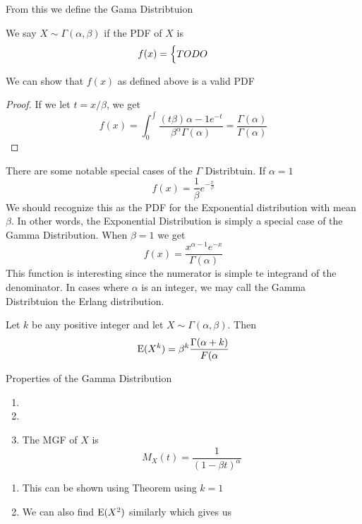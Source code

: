 \documentclass{report}
\begin{document}
From this we define the Gama Distribtuion
\begin{definition}
    We say $X\sim\Gamma(\alpha,\beta)$ if the PDF of $X$ is
    \[
        f(x)=\begin{cases}
            TODO\quad
        \end{cases}
    \]
\end{definition}
We can show that $f(x)$ as defined above is a valid PDF
\begin{proof}
    If we let $t=x/\beta$, we get
    \[
        f(x)=\int_0^\int \frac{(t\beta)^{}\alpha-1 e^{-t}}{\beta^{\alpha} \Gamma(\alpha)}=\frac{\Gamma(\alpha)}{\Gamma(\alpha)}
    \]
\end{proof}

There are some notable special cases of the $\Gamma $ Distribtuin. If $\alpha = 1 $
\[
    f(x)=\frac 1\beta e^{-\frac x \beta}
\]
We should recognize this as the PDF for the Exponential distribution with mean $\beta$. In other words, the Exponential Distribution is simply a special case of the Gamma Distribution. When $\beta=1$ we get
\[
    f(x)=\frac{x^{\alpha-1}e^{-x}}{\Gamma(\alpha)}
\]
This function is interesting since the numerator is simple te integrand of the denominator. In cases where $\alpha$ is an integer, we may call the Gamma Distribtuion the Erlang distribution.
\begin{theorem}
    Let $k$ be any positive integer and let $X\sim \Gamma(\alpha,\beta)$. Then
    \[
        \textup{E}(X^k)=\beta^k \frac{\Gamma(\alpha+k)}{F(\alpha}
    \]
    
\end{theorem}

\begin{theorem}
    {Properties of the Gamma Distribution}
    \begin{enumerate}
        \item 
        \item 
        \item The MGF of $X$ is 
        \[
            M_X(t)=\frac 1 {(1-\beta t)^\alpha}
        \]
    \end{enumerate}
    \begin{enumerate}
        \item This can be shown using Theorem \todo using $k=1$
        \item We can also find $\textup{E}(X^2)$ similarly which gives us
    \end{enumerate}
\end{theorem}
\end{document}
